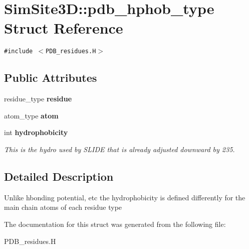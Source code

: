 \section{SimSite3D::pdb\_\-hphob\_\-type Struct Reference}
\label{structSimSite3D_1_1pdb__hphob__type}
{\tt \#include $<$PDB\_\-residues.H$>$}

\subsection*{Public Attributes}
\begin{CompactItemize}
\item 
residue\_\-type \textbf{residue}\label{structSimSite3D_1_1pdb__hphob__type_b2d56532756a4855bffb768a22df0bd3}

\item 
atom\_\-type \textbf{atom}\label{structSimSite3D_1_1pdb__hphob__type_450d8d9410b599b3c50ded60ded76535}

\item 
int \bf{hydrophobicity}\label{structSimSite3D_1_1pdb__hphob__type_a159bae42d7108f85a2b1067fae5a251}

\begin{CompactList}\small\item\em This is the hydro used by SLIDE that is already adjusted downward by 235. \item\end{CompactList}\end{CompactItemize}


\subsection{Detailed Description}
Unlike hbonding potential, etc the hydrophobicity is defined differently for the main chain atoms of each residue type 



The documentation for this struct was generated from the following file:\begin{CompactItemize}
\item 
PDB\_\-residues.H\end{CompactItemize}
